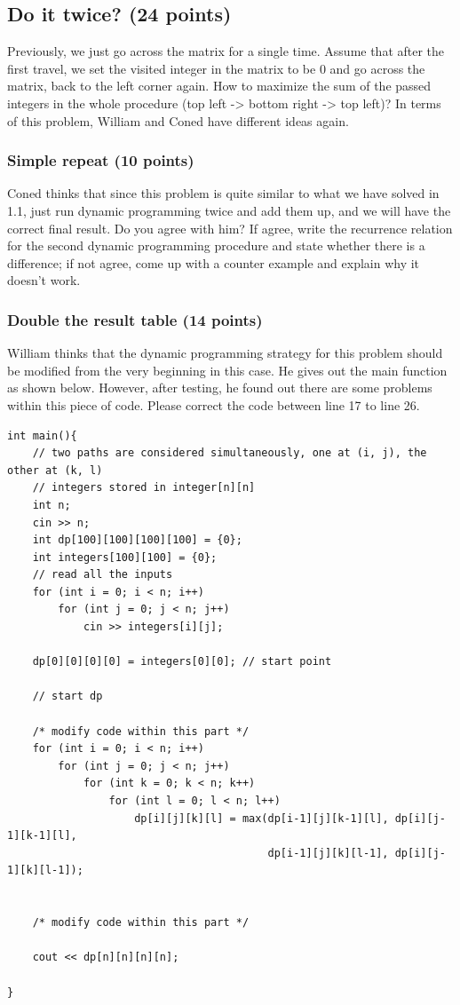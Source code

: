\documentclass[11pt]{exam}
\begin{document}
\subsection{Do it twice? (24 points)}
Previously, we just go across the matrix for a single time. Assume that after the first travel, we set the visited integer in the matrix to be 0 and go across the matrix, back to the left corner again. How to maximize the sum of the passed integers in the whole procedure (top left -> bottom right -> top left)? In terms of this problem, William and Coned have different ideas again.
\subsubsection{Simple repeat (10 points)}
Coned thinks that since this problem is quite similar to what we have solved in 1.1, just {\color{blue}run dynamic programming twice} and add them up, and we will have the correct final result. Do you agree with him? If agree, write the recurrence relation for the second dynamic programming procedure and state whether there is a difference; if not agree, come up with a counter example and explain why it doesn't work.
\begin{solution}
\end{solution}
\subsubsection{Double the result table (14 points)}
William thinks that the dynamic programming strategy for this problem should be {\color{blue}modified from the very beginning} in this case. He gives out the main function as shown below. However, after testing, he found out there are some problems within this piece of code. Please correct the code between line 17 to line 26.
\newpage 
\begin{lstlisting}
int main(){
    // two paths are considered simultaneously, one at (i, j), the other at (k, l)
    // integers stored in integer[n][n]
    int n;
    cin >> n;
    int dp[100][100][100][100] = {0};
    int integers[100][100] = {0};
    // read all the inputs
    for (int i = 0; i < n; i++)
        for (int j = 0; j < n; j++)
            cin >> integers[i][j];
    
    dp[0][0][0][0] = integers[0][0]; // start point
    
    // start dp
    
    /* modify code within this part */
    for (int i = 0; i < n; i++)
        for (int j = 0; j < n; j++)
            for (int k = 0; k < n; k++)
                for (int l = 0; l < n; l++)
                    dp[i][j][k][l] = max(dp[i-1][j][k-1][l], dp[i][j-1][k-1][l],
                                         dp[i-1][j][k][l-1], dp[i][j-1][k][l-1]);
                                         
                                         
    /* modify code within this part */
    
    cout << dp[n][n][n][n];
    
}
\end{lstlisting}
\end{document}
